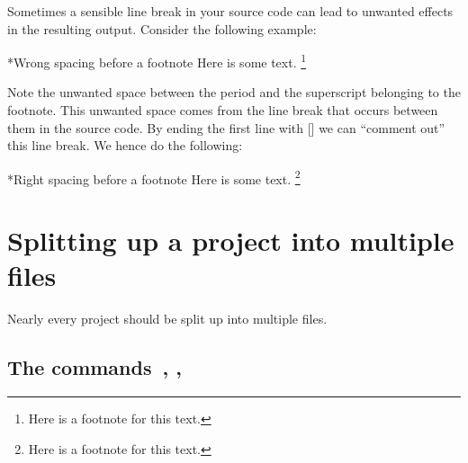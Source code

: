 Sometimes a sensible line break in your source code can lead to unwanted effects in the resulting output.
Consider the following example:
\begin{showlatex}*{Wrong spacing before a footnote}
Here is some text.
\footnote{Here is a footnote for this text.}
\end{showlatex}
Note the unwanted space between the period and the superscript belonging to the footnote.
This unwanted space comes from the line break that occurs between them in the source code.
By ending the first line with \inlinecode{\%}\massindex{\%}[\inlinecode] we can \enquote{comment out} this line break.
We hence do the following:
\begin{showlatex}*{Right spacing before a footnote}
Here is some text.%
\footnote{Here is a footnote for this text.}
\end{showlatex}





\section{Splitting up a project into multiple files}

Nearly every project should be split up into multiple files.



\subsection{The commands~, , }


